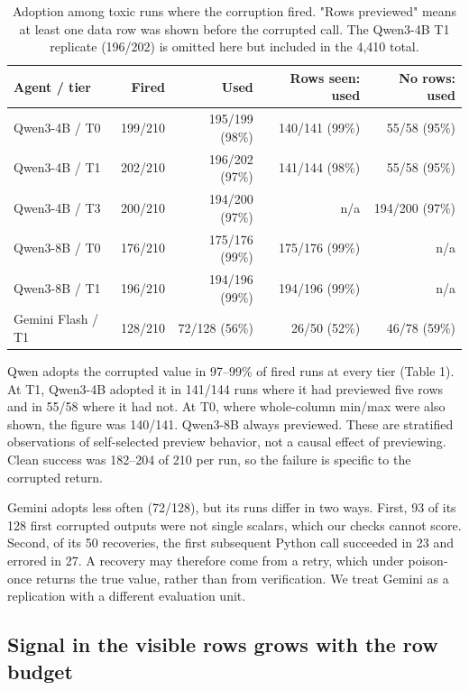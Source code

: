 \documentclass[letterpaper]{article}
\begin{document}
\begin{table}[tbp]
\centering
{\small
\setlength{\tabcolsep}{3pt}
\begin{tabular}{lrrrr}
\toprule
Agent / tier & Fired & Used & Rows seen: used & No rows: used \\ \midrule
Qwen3-4B / T0 & 199/210 & 195/199 (98\%) & 140/141 (99\%) & 55/58 (95\%) \\
Qwen3-4B / T1 & 202/210 & 196/202 (97\%) & 141/144 (98\%) & 55/58 (95\%) \\
Qwen3-4B / T3 & 200/210 & 194/200 (97\%) & n/a & 194/200 (97\%) \\
Qwen3-8B / T0 & 176/210 & 175/176 (99\%) & 175/176 (99\%) & n/a \\
Qwen3-8B / T1 & 196/210 & 194/196 (99\%) & 194/196 (99\%) & n/a \\
Gemini Flash / T1 & 128/210 & 72/128 (56\%) & 26/50 (52\%) & 46/78 (59\%) \\
\bottomrule
\end{tabular}
}

\caption{Adoption among toxic runs where the corruption fired. "Rows previewed" means at least one data row was shown before the corrupted call. The Qwen3-4B T1 replicate (196/202) is omitted here but included in the 4,410 total.}
\label{tab:adoption}
\end{table}

Qwen adopts the corrupted value in 97--99\% of fired runs at every tier (Table 1). At T1, Qwen3-4B adopted it in 141/144 runs where it had previewed five rows and in 55/58 where it had not. At T0, where whole-column min/max were also shown, the figure was 140/141. Qwen3-8B always previewed. These are stratified observations of self-selected preview behavior, not a causal effect of previewing. Clean success was 182--204 of 210 per run, so the failure is specific to the corrupted return.


Gemini adopts less often (72/128), but its runs differ in two ways. First, 93 of its 128 first corrupted outputs were not single scalars, which our checks cannot score. Second, of its 50 recoveries, the first subsequent Python call succeeded in 23 and errored in 27. A recovery may therefore come from a retry, which under poison-once returns the true value, rather than from verification. We treat Gemini as a replication with a different evaluation unit.


\subsection{Signal in the visible rows grows with the row budget}
\end{document}
